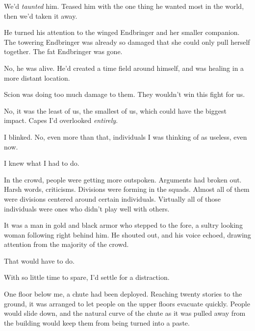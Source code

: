We'd \emph{taunted} him.  Teased him with the one thing he wanted most in the world, then we'd taken it away.



He turned his attention to the winged Endbringer and her smaller companion.  The towering Endbringer was already so damaged that she could only pull herself together.  The fat Endbringer was gone.



No, he was alive.  He'd created a time field around himself, and was healing in a more distant location.



Scion was doing too much damage to them.  They wouldn't win this fight for us.



No, it was the least of us, the smallest of us, which could have the biggest impact.  Capes I'd overlooked \emph{entirely}.



I blinked.  No, even more than that, individuals I was thinking of as useless, even now.



I knew what I had to do.



In the crowd, people were getting more outspoken.  Arguments had broken out.  Harsh words, criticisms.  Divisions were forming in the squads.  Almost all of them were divisions centered around certain individuals.  Virtually all of those individuals were ones who didn't play well with others.



It was a man in gold and black armor who stepped to the fore, a sultry looking woman following right behind him.  He shouted out, and his voice echoed, drawing attention from the majority of the crowd.



That would have to do.



With so little time to spare, I'd settle for a distraction.



One floor below me, a chute had been deployed.  Reaching twenty stories to the ground, it was arranged to let people on the upper floors evacuate quickly.  People would slide down, and the natural curve of the chute as it was pulled away from the building would keep them from being turned into a paste.



